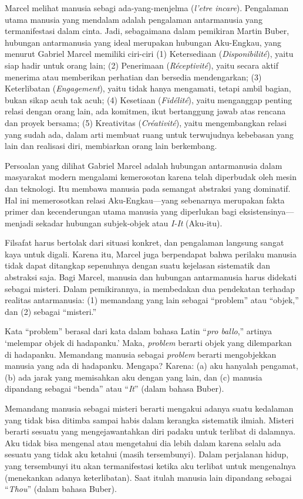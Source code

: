 \documentclass[10pt,a4paper]{article}
\begin{document}
\begin{multicols}{2}
Marcel melihat manusia sebagi ada-yang-menjelma (\emph{l'etre incare}).
Pengalaman utama manusia yang mendalam adalah pengalaman antarmanusia
yang termanifestasi dalam cinta. Jadi, sebagaimana dalam pemikiran
Martin Buber, hubungan antarmanusia yang ideal merupakan hubungan
Aku-Engkau, yang menurut Gabriel Marcel memiliki ciri-ciri (1)
Ketersediaan (\emph{Disponibilité}), yaitu siap hadir untuk orang lain;
(2) Penerimaan (\emph{Réceptivité}), yaitu secara aktif menerima atau
memberikan perhatian dan bersedia mendengarkan; (3) Keterlibatan
(\emph{Engagement}), yaitu tidak hanya mengamati, tetapi ambil bagian,
bukan sikap acuh tak acuh; (4) Kesetiaan (\emph{Fidélité}), yaitu
menganggap penting relasi dengan orang lain, ada komitmen, ikut
bertanggung jawab atas rencana dan proyek bersama; (5) Kreativitas
(\emph{Créativité}), yaitu mengembangkan relasi yang sudah ada, dalam
arti membuat ruang untuk terwujudnya kebebasan yang lain dan realisasi
diri, membiarkan orang lain berkembang.

Persoalan yang dilihat Gabriel Marcel adalah hubungan antarmanusia dalam
masyarakat modern mengalami kemerosotan karena telah diperbudak oleh
mesin dan teknologi. Itu membawa manusia pada semangat abstraksi yang
dominatif. Hal ini memerosotkan relasi Aku-Engkau---yang sebenarnya
merupakan fakta primer dan kecenderungan utama manusia yang diperlukan
bagi eksistensinya---menjadi sekadar hubungan subjek-objek atau
\emph{I-It} (Aku-itu).

Filsafat harus bertolak dari situasi konkret, dan pengalaman langsung
sangat kaya untuk digali. Karena itu, Marcel juga berpendapat bahwa
perilaku manusia tidak dapat ditangkap sepenuhnya dengan suatu kejelasan
sistematik dan abstraksi saja. Bagi Marcel, manusia dan hubungan
antarmanusia harus didekati sebagai misteri. Dalam pemikirannya, ia
membedakan dua pendekatan terhadap realitas antarmanusia: (1) memandang
yang lain sebagai ``problem'' atau ``objek,'' dan (2) sebagai
``misteri.''

Kata ``problem'' berasal dari kata dalam bahasa Latin ``\emph{pro
ballo},'' artinya `melempar objek di hadapanku.' Maka, \emph{problem}
berarti objek yang dilemparkan di hadapanku. Memandang manusia sebagai
\emph{problem} berarti mengobjekkan manusia yang ada di hadapanku.
Mengapa? Karena: (a) aku hanyalah pengamat, (b) ada jarak yang
memisahkan aku dengan yang lain, dan (c) manusia dipandang sebagai
``benda'' atau ``\emph{It}'' (dalam bahasa Buber).

Memandang manusia sebagai misteri berarti mengakui adanya suatu
kedalaman yang tidak bisa ditimba sampai habis dalam kerangka sistematik
ilmiah. Misteri berarti sesuatu yang mengejawantahkan diri padaku untuk
terlibat di dalamnya. Aku tidak bisa mengenal atau mengetahui dia lebih
dalam karena selalu ada sesuatu yang tidak aku ketahui (masih
tersembunyi). Dalam perjalanan hidup, yang tersembunyi itu akan
termanifestasi ketika aku terlibat untuk mengenalnya (menekankan adanya
keterlibatan). Saat itulah manusia lain dipandang sebagai
``\emph{Thou}'' (dalam bahasa Buber).


\end{multicols}
\end{document}
